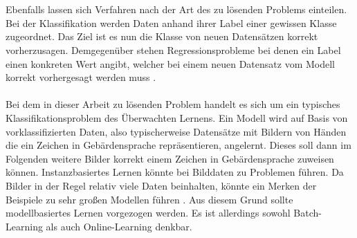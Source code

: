\documentclass[11pt,bibliography=totocnumbered]{scrartcl}
\begin{document}
\\\\
Ebenfalls lassen sich Verfahren nach der Art des zu lösenden Problems einteilen. Bei der Klassifikation werden Daten anhand ihrer Label einer gewissen Klasse zugeordnet. Das Ziel ist es nun die Klasse von neuen Datensätzen korrekt vorherzusagen. Demgegenüber stehen Regressionsprobleme bei denen ein Label einen konkreten Wert angibt, welcher bei einem neuen Datensatz vom Modell korrekt vorhergesagt werden muss \cite[S.8-9]{MACHINE_LEARNING}\cite[S.2]{BA}.
\\\\
Bei dem in dieser Arbeit zu lösenden Problem handelt es sich um ein typisches Klassifikationsproblem des Überwachten Lernens. Ein Modell wird auf Basis von vorklassifizierten Daten, also typischerweise Datensätze mit Bildern von Händen die ein Zeichen in Gebärdensprache repräsentieren,  angelernt. Dieses soll dann im Folgenden weitere Bilder korrekt einem Zeichen in Gebärdensprache zuweisen können. Instanzbasiertes Lernen könnte bei Bilddaten zu Problemen führen. Da Bilder in der Regel relativ viele Daten beinhalten, könnte ein Merken der Beispiele zu sehr großen Modellen führen \cite[S.18]{MACHINE_LEARNING}. Aus diesem Grund sollte modellbasiertes Lernen vorgezogen werden. Es ist allerdings sowohl Batch-Learning als auch Online-Learning denkbar.
\end{document}
